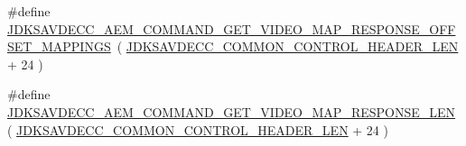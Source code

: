 \begin{DoxyCompactItemize}
\item 
\#define \hyperlink{group__command__get__video__map__response_ga7d58ed341e2d4f9c3fdac0bc5d5e7570}{J\+D\+K\+S\+A\+V\+D\+E\+C\+C\+\_\+\+A\+E\+M\+\_\+\+C\+O\+M\+M\+A\+N\+D\+\_\+\+G\+E\+T\+\_\+\+V\+I\+D\+E\+O\+\_\+\+M\+A\+P\+\_\+\+R\+E\+S\+P\+O\+N\+S\+E\+\_\+\+O\+F\+F\+S\+E\+T\+\_\+\+M\+A\+P\+P\+I\+N\+GS}~( \hyperlink{group__jdksavdecc__avtp__common__control__header_gaae84052886fb1bb42f3bc5f85b741dff}{J\+D\+K\+S\+A\+V\+D\+E\+C\+C\+\_\+\+C\+O\+M\+M\+O\+N\+\_\+\+C\+O\+N\+T\+R\+O\+L\+\_\+\+H\+E\+A\+D\+E\+R\+\_\+\+L\+EN} + 24 )
\item 
\#define \hyperlink{group__command__get__video__map__response_gac6a37b122e7b0c7d2a90ed750cfb748a}{J\+D\+K\+S\+A\+V\+D\+E\+C\+C\+\_\+\+A\+E\+M\+\_\+\+C\+O\+M\+M\+A\+N\+D\+\_\+\+G\+E\+T\+\_\+\+V\+I\+D\+E\+O\+\_\+\+M\+A\+P\+\_\+\+R\+E\+S\+P\+O\+N\+S\+E\+\_\+\+L\+EN}~( \hyperlink{group__jdksavdecc__avtp__common__control__header_gaae84052886fb1bb42f3bc5f85b741dff}{J\+D\+K\+S\+A\+V\+D\+E\+C\+C\+\_\+\+C\+O\+M\+M\+O\+N\+\_\+\+C\+O\+N\+T\+R\+O\+L\+\_\+\+H\+E\+A\+D\+E\+R\+\_\+\+L\+EN} + 24 )
\end{DoxyCompactItemize}
